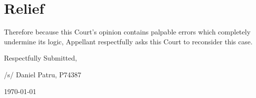 \documentclass[12pt,\documentclassflag]{michiganCourtOfAppealsBrief}
\begin{document}
\section{Relief}

Therefore because this Court's opinion contains palpable errors which completely undermine its logic, Appellant respectfully asks this Court to reconsider this case.




\vspace{1\baselineskip}

{ \setlength{\leftskip}{3.5in}
  Respectfully Submitted,

  /s/ Daniel Patru, P74387

\today

  \setlength{\leftskip}{0pt}}


\newpage\empty%
\end{document}
